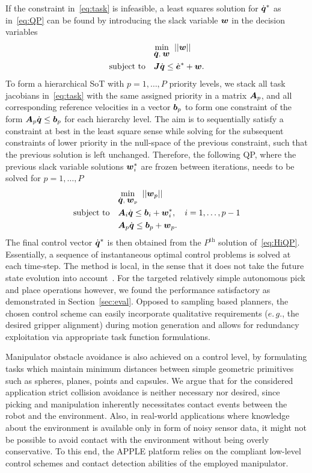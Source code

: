 If the constraint in~\eqref{eq:task} is infeasible, a least squares solution for $\dot{\mbox{\boldmath $q$}}^*$ as
in~\eqref{eq:QP} can be found by introducing the slack variable $\mbox{\boldmath $w$}$ in the decision variables
%
\begin{align}\label{eq:iQP}
  &\underset{\dot{\mbox{\boldmath $q$}},\;\mbox{\boldmath $w$}}{\mbox{min}}\;\;||\mbox{\boldmath $w$}||\\
   \mbox{subject to} \quad &\mbox{\boldmath $J$}\dot{\mbox{\boldmath $q$}} \leq \dot{\mbox{\boldmath $e$}}^* + \mbox{\boldmath $w$}. \nonumber
\end{align}
%
To form a hierarchical SoT with $p=1,\dots,P$ priority levels, we stack all task jacobians
in~\eqref{eq:task} with the same assigned priority in a matrix $\mbox{\boldmath $A$}_p$, and all corresponding
reference velocities in a vector $\mbox{\boldmath $b$}_p$ to form one constraint of the form
$\mbox{\boldmath $A$}_p\dot{\mbox{\boldmath $q$}}\leq \mbox{\boldmath $b$}_p$ for each hierarchy level. The aim is to sequentially satisfy
a constraint at best in the least square sense while solving for the subsequent constraints of lower
priority in the null-space of the previous constraint, such that the previous solution is left
unchanged. Therefore, the following QP, where the previous slack variable solutions $\mbox{\boldmath $w$}_i^*$
are frozen between iterations, needs to be solved for $p=1,\ldots,P$
%
\begin{align}\label{eq:HiQP}
  &\underset{\dot{\mbox{\boldmath $q$}},\;\mbox{\boldmath $w$}_p}{\mbox{min}}\;\;||\mbox{\boldmath $w$}_p||\\
   \mbox{subject to} \quad &\mbox{\boldmath $A$}_i\dot{\mbox{\boldmath $q$}} \leq \mbox{\boldmath $b$}_i + \mbox{\boldmath $w$}_i^*, \quad i=1,\dots,p-1 \nonumber \\
                           &\mbox{\boldmath $A$}_p\dot{\mbox{\boldmath $q$}} \leq \mbox{\boldmath $b$}_p + \mbox{\boldmath $w$}_p.  \nonumber 
\end{align}
%
The final control vector $\dot{\mbox{\boldmath $q$}}^*$ is then obtained from the $P^{\mbox{th}}$ solution
of~\eqref{eq:HiQP}. Essentially, a sequence of instantaneous optimal control problems is solved at
each time-step. The method is local, in the sense that it does not take the future state evolution
into account~\cite{DelP14}. For the targeted relatively simple autonomous pick and place operations
however, we found the performance satisfactory as demonstrated in Section~\ref{sec:eval}. Opposed to
sampling based planners, the chosen control scheme can easily incorporate qualitative requirements
($e.\,g.$, the desired gripper alignment) during motion generation and allows for redundancy
exploitation via appropriate task function formulations.

Manipulator obstacle avoidance is also achieved on a control level, by formulating tasks which
maintain minimum distances between simple geometric primitives such as spheres, planes, points and
capsules. We argue that for the considered application strict collision avoidance is neither
necessary nor desired, since picking and manipulation inherently necessitates contact events between
the robot and the environment. Also, in real-world applications where knowledge about the
environment is available only in form of noisy sensor data, it might not be possible to avoid
contact with the environment without being overly conservative. To this end, the APPLE platform
relies on the compliant low-level control schemes and contact detection abilities of the employed
manipulator.
%
